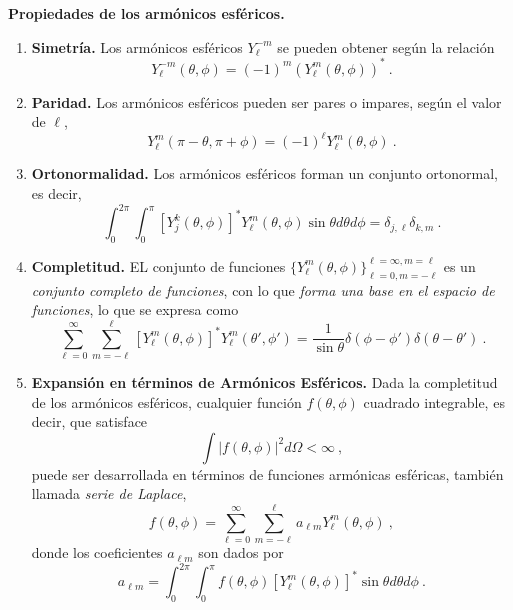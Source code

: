 \begin{propiedad}
    \textbf{Propiedades de los armónicos esféricos.}

    \begin{enumerate}
        \item \textbf{Simetría.} Los armónicos esféricos $Y_\ell^{-m}$ se pueden obtener según la relación
        \begin{equation}
            Y_\ell^{-m}(\theta, \phi) = (-1)^m (Y_\ell^m (\theta, \phi))^\ast \ .
        \end{equation}
    
        \item \textbf{Paridad.} Los armónicos esféricos pueden ser pares o impares, según el valor de $\ell$,
        \begin{equation}
            Y_\ell^m(\pi - \theta, \pi + \phi) = (-1)^\ell Y_\ell^m(\theta, \phi) \ .
        \end{equation}
    
        \item \textbf{Ortonormalidad.} Los armónicos esféricos forman un conjunto ortonormal, es decir,
        \begin{equation}
            \int_0^{2\pi} \int_0^\pi \left[Y_j^k(\theta, \phi)\right]^\ast Y_\ell^m (\theta, \phi) \sin\theta d\theta d\phi = \delta_{j, \ell} \delta_{k, m} \ .
        \end{equation}
    
        \item \textbf{Completitud.} EL conjunto de funciones $\{ Y_\ell^m(\theta, \phi) \}_{\ell = 0, m = -\ell}^{\ell = \infty, m = \ell}$ es un \emph{conjunto completo de funciones}, con lo que \emph{forma una base en el espacio de funciones}, lo que se expresa como
        \begin{equation}
            \sum_{\ell = 0}^{\infty} \sum_{m = -\ell}^{\ell} \left[Y_\ell^m (\theta, \phi)\right]^\ast Y_{\ell}^m (\theta', \phi') = \frac{1}{\sin \theta} \delta(\phi - \phi') \delta(\theta - \theta') \ .
        \end{equation}
        
        \item \textbf{Expansión en términos de Armónicos Esféricos.} Dada la completitud de los armónicos esféricos, cualquier función $f(\theta, \phi)$ cuadrado integrable, es decir, que satisface
        \begin{equation}
            \int | f(\theta, \phi) |^2 d\Omega < \infty \ ,
        \end{equation}
        puede ser desarrollada en términos de funciones armónicas esféricas, también llamada \emph{serie de Laplace},
        \begin{equation}
            f(\theta, \phi) = \sum_{\ell = 0}^{\infty} \sum_{m = -\ell}^{\ell} a_{\ell m} Y_\ell^m (\theta, \phi) \ ,
        \end{equation}
        donde los coeficientes $a_{\ell m}$ son dados por
        \begin{equation}
            a_{\ell m} = \int_{0}^{2\pi} \int_{0}^{\pi} f(\theta, \phi) \left[Y_\ell^m (\theta, \phi)\right]^\ast \sin\theta d\theta d\phi \ .
        \end{equation}
    

\end{enumerate}
\end{propiedad}
